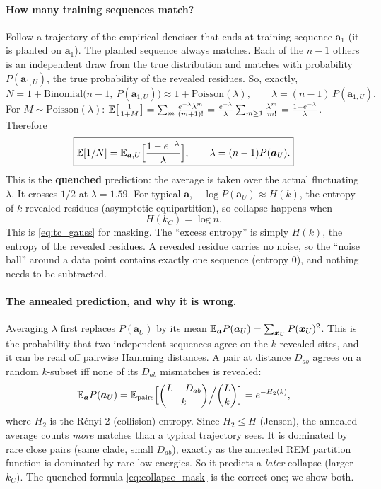 \paragraph{How many training sequences match?} Follow a trajectory of the empirical denoiser that ends at training
sequence $\bm a_1$ (it is planted on $\bm a_1$). The planted sequence always matches. Each of the $n-1$ others is an
independent draw from the true distribution and matches with probability $P(\bm a_{1,U})$, the true probability of the
revealed residues. So, exactly,
\[
N=1+\mathrm{Binomial}\big(n-1,\ P(\bm a_{1,U})\big)\approx1+\mathrm{Poisson}(\lambda),\qquad \lambda=(n-1)\,P(\bm a_{1,U}).
\]
For $M\sim\mathrm{Poisson}(\lambda)$:
$\mathbb{E}\big[\tfrac1{1+M}\big]=\sum_m\frac{e^{-\lambda}\lambda^m}{(m+1)!}=\frac{e^{-\lambda}}\lambda\sum_{m\ge1}\frac{\lambda^m}{m!}
=\frac{1-e^{-\lambda}}{\lambda}$. Therefore
\begin{equation}\label{eq:collapse_mask}
\boxed{\mathbb{E}[1/N]=\mathbb{E}_{\bm a,U}\Big[\frac{1-e^{-\lambda}}{\lambda}\Big],\qquad \lambda=(n-1)P(\bm a_U).}
\end{equation}
This is the \textbf{quenched} prediction: the average is taken over the actual fluctuating $\lambda$. It crosses $1/2$
at $\lambda=1.59$. For typical $\bm a$, $-\log P(\bm a_U)\approx H(k)$, the entropy of $k$ revealed residues
(asymptotic equipartition), so collapse happens when
\begin{equation}\label{eq:tc_mask}
\boxed{H(k_C)=\log n.}
\end{equation}
This is \eqref{eq:tc_gauss} for masking. The ``excess entropy'' is simply $H(k)$, the entropy of the revealed
residues. A revealed residue carries no noise, so the ``noise ball'' around a data point contains exactly one
sequence (entropy 0), and nothing needs to be subtracted.

\paragraph{The annealed prediction, and why it is wrong.} Averaging $\lambda$ first replaces $P(\bm a_U)$ by its mean
$\mathbb{E}_{\bm a}P(\bm a_U)=\sum_{\bm x_U}P(\bm x_U)^2$. This is the probability that two independent sequences agree on the
$k$ revealed sites, and it can be read off pairwise Hamming distances. A pair at distance $D_{ab}$ agrees on a random
$k$-subset iff none of its $D_{ab}$ mismatches is revealed:
\begin{equation}\label{eq:collision}
\mathbb{E}_{\bm a}P(\bm a_U)=\mathbb{E}_{\text{pairs}}\Big[\binom{L-D_{ab}}{k}\Big/\binom Lk\Big]=e^{-H_2(k)},
\end{equation}
where $H_2$ is the Rényi-2 (collision) entropy. Since $H_2\le H$ (Jensen), the annealed average counts \emph{more}
matches than a typical trajectory sees. It is dominated by rare close pairs (same clade, small $D_{ab}$), exactly as
the annealed REM partition function is dominated by rare low energies. So it predicts a \emph{later} collapse (larger
$k_C$). The quenched formula \eqref{eq:collapse_mask} is the correct one; we show both.

